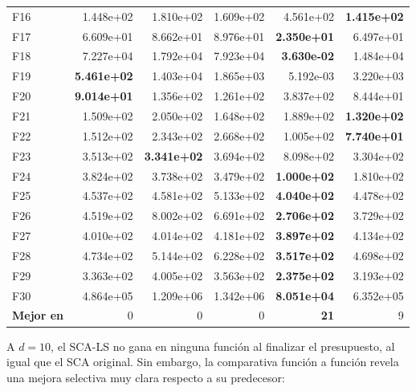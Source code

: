 \documentclass[12pt,a4paper]{article}
\begin{document}
\begin{longtable}{lrrrrr}
F16  & 1.448e+02 & 1.810e+02 & 1.609e+02 & 4.561e+02 & \textbf{1.415e+02} \\
F17  & 6.609e+01 & 8.662e+01 & 8.976e+01 & \textbf{2.350e+01} & 6.497e+01 \\
F18  & 7.227e+04 & 1.792e+04 & 7.923e+04 & \textbf{3.630e-02} & 1.484e+04 \\
F19  & \textbf{5.461e+02} & 1.403e+04 & 1.865e+03 & 5.192e-03 & 3.220e+03 \\
F20  & \textbf{9.014e+01} & 1.356e+02 & 1.261e+02 & 3.837e+02 & 8.444e+01 \\
F21  & 1.509e+02 & 2.050e+02 & 1.648e+02 & 1.889e+02 & \textbf{1.320e+02} \\
F22  & 1.512e+02 & 2.343e+02 & 2.668e+02 & 1.005e+02 & \textbf{7.740e+01} \\
F23  & 3.513e+02 & \textbf{3.341e+02} & 3.694e+02 & 8.098e+02 & 3.304e+02 \\
F24  & 3.824e+02 & 3.738e+02 & 3.479e+02 & \textbf{1.000e+02} & 1.810e+02 \\
F25  & 4.537e+02 & 4.581e+02 & 5.133e+02 & \textbf{4.040e+02} & 4.478e+02 \\
F26  & 4.519e+02 & 8.002e+02 & 6.691e+02 & \textbf{2.706e+02} & 3.729e+02 \\
F27  & 4.010e+02 & 4.014e+02 & 4.181e+02 & \textbf{3.897e+02} & 4.134e+02 \\
F28  & 4.734e+02 & 5.144e+02 & 6.228e+02 & \textbf{3.517e+02} & 4.698e+02 \\
F29  & 3.363e+02 & 4.005e+02 & 3.563e+02 & \textbf{2.375e+02} & 3.193e+02 \\
F30  & 4.864e+05 & 1.209e+06 & 1.342e+06 & \textbf{8.051e+04} & 6.352e+05 \\
\midrule
\textbf{Mejor en} & 0 & 0 & 0 & \textbf{21} & 9 \\
\end{longtable}

A $d=10$, el SCA-LS no gana en ninguna función al finalizar el presupuesto, al igual que el SCA original. Sin embargo, la comparativa función a función revela una mejora selectiva muy clara respecto a su predecesor:
\end{document}

